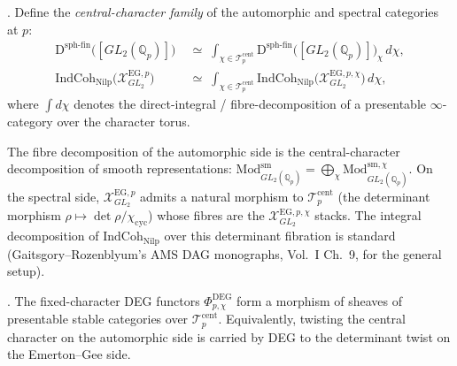 \begin{definition}
\label{v4-arith:deg-f1a:def:central-char-family}
\ClaimStatusDefinitional. Define the \emph{central-character
family} of the automorphic and spectral categories at \(p\):
\begin{align}
\mathrm{D}^{\mathrm{sph\text{-}fin}}\bigl([GL_{2}(\mathbb{Q}_{p})]\bigr)
&\;\simeq\;\int_{\chi\in\mathcal{T}^{\mathrm{cent}}_{p}}\mathrm{D}^{\mathrm{sph\text{-}fin}}\bigl([GL_{2}(\mathbb{Q}_{p})]\bigr)_{\chi}\,d\chi,\\
\mathrm{IndCoh}_{\mathrm{Nilp}}\bigl(\mathcal{X}^{\mathrm{EG},p}_{GL_{2}}\bigr)
&\;\simeq\;\int_{\chi\in\mathcal{T}^{\mathrm{cent}}_{p}}\mathrm{IndCoh}_{\mathrm{Nilp}}\bigl(\mathcal{X}^{\mathrm{EG},p,\chi}_{GL_{2}}\bigr)\,d\chi,
\end{align}
where \(\int d\chi\) denotes the direct-integral / fibre-decomposition
of a presentable \(\infty\)-category over the character torus.
\end{definition}

\begin{remark}
\label{v4-arith:deg-f1a:rem:fibre-decomp-standard}
The fibre decomposition of the automorphic side is the central-character
decomposition of smooth representations: \(\mathrm{Mod}^{\mathrm{sm}}_{GL_{2}(\mathbb{Q}_{p})}=\bigoplus_{\chi}\mathrm{Mod}^{\mathrm{sm},\chi}_{GL_{2}(\mathbb{Q}_{p})}\).
On the spectral side, \(\mathcal{X}^{\mathrm{EG},p}_{GL_{2}}\) admits
a natural morphism to \(\mathcal{T}^{\mathrm{cent}}_{p}\) (the
determinant morphism \(\rho\mapsto\det\rho/\chi_{\mathrm{cyc}}\))
whose fibres are the \(\mathcal{X}^{\mathrm{EG},p,\chi}_{GL_{2}}\)
stacks. The integral decomposition of \(\mathrm{IndCoh}_{\mathrm{Nilp}}\)
over this determinant fibration is standard (Gaitsgory--Rozenblyum's
AMS DAG monographs, Vol.~I Ch.~9, for the general setup).
\end{remark}

\begin{conjecture}
\label{v4-arith:deg-f1a:conj:central-character-family}
\ClaimStatusConjectured. The fixed-character DEG functors
\(\Phi^{\mathrm{DEG}}_{p,\chi}\) form a morphism of sheaves of
presentable stable categories over
\(\mathcal{T}^{\mathrm{cent}}_{p}\).  Equivalently, twisting the
central character on the automorphic side is carried by DEG to the
determinant twist on the Emerton--Gee side.
\end{conjecture}

